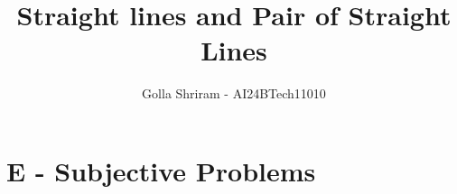 \documentclass[journal,12pt,twocolumn]{IEEEtran}
\theoremstyle{remark}
\begin{document}

\vspace{3cm}
\title{Straight lines and Pair of Straight Lines}
\author{Golla Shriram - AI24BTech11010}

\maketitle
\newpage
\bigskip

\renewcommand{\thefigure}{\theenumi}
\renewcommand{\thetable}{\theenumi}

\section{E - Subjective Problems}
                                                                           
\end{document}
